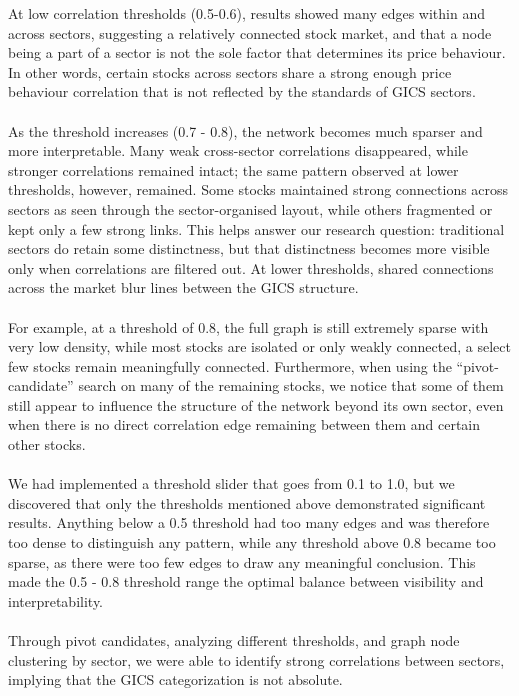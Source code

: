 \documentclass[fontsize=11pt]{article}
\begin{document}
At low correlation thresholds (0.5-0.6), results showed many edges within and across sectors, suggesting a relatively connected stock market, and that a node being a part of a sector is not the sole factor that determines its price behaviour. In other words, certain stocks across sectors share a strong enough price behaviour correlation that is not reflected by the standards of GICS sectors.\\\\

As the threshold increases (0.7 - 0.8), the network becomes much sparser and more interpretable. Many weak cross-sector correlations disappeared, while stronger correlations remained intact; the same pattern observed at lower thresholds, however, remained. Some stocks maintained strong connections across sectors as seen through the sector-organised layout, while others fragmented or kept only a few strong links. This helps answer our research question: traditional sectors do retain some distinctness, but that distinctness becomes more visible only when correlations are filtered out. At lower thresholds, shared connections across the market blur lines between the GICS structure.\\\\

For example, at a threshold of 0.8, the full graph is still extremely sparse with very low density, while most stocks are isolated or only weakly connected, a select few stocks remain meaningfully connected. Furthermore, when using the “pivot-candidate” search on many of the remaining stocks, we notice that some of them still appear to influence the structure of the network beyond its own sector, even when there is no direct correlation edge remaining between them and certain other stocks.\\\\

We had implemented a threshold slider that goes from 0.1 to 1.0, but we discovered that only the thresholds mentioned above demonstrated significant results. Anything below a 0.5 threshold had too many edges and was therefore too dense to distinguish any pattern, while any threshold above 0.8 became too sparse, as there were too few edges to draw any meaningful conclusion. This made the 0.5 - 0.8 threshold range the optimal balance between visibility and interpretability.\\\\

Through pivot candidates, analyzing different thresholds, and graph node clustering by sector, we were able to identify strong correlations between sectors, implying that the GICS categorization is not absolute.\\\\
\end{document}
